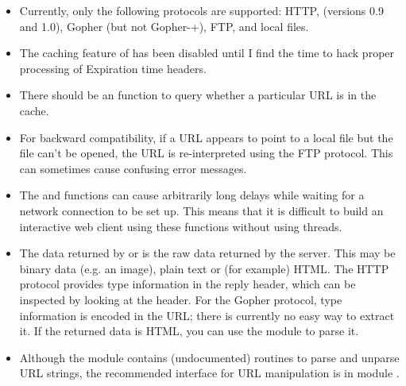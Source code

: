 \begin{itemize}

\item
Currently, only the following protocols are supported: HTTP, (versions
0.9 and 1.0), Gopher (but not Gopher-+), FTP, and local files.

\item
The caching feature of  has been disabled until I
find the time to hack proper processing of Expiration time headers.

\item
There should be an function to query whether a particular URL is in
the cache.

\item
For backward compatibility, if a URL appears to point to a local file
but the file can't be opened, the URL is re-interpreted using the FTP
protocol.  This can sometimes cause confusing error messages.

\item
The  and  functions can cause
arbitrarily long delays while waiting for a network connection to be
set up.  This means that it is difficult to build an interactive
web client using these functions without using threads.

\item
The data returned by  or  is the
raw data returned by the server.  This may be binary data (e.g. an
image), plain text or (for example) HTML.  The HTTP protocol provides
type information in the reply header, which can be inspected by
looking at the  header.  For the Gopher protocol,
type information is encoded in the URL; there is currently no easy way
to extract it.  If the returned data is HTML, you can use the module
 to parse it.

\item
Although the  module contains (undocumented) routines to
parse and unparse URL strings, the recommended interface for URL
manipulation is in module .

\end{itemize}
